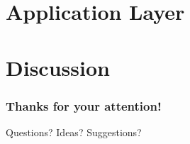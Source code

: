\documentclass{beamer}
\begin{document}


\section{Application Layer}


\section*{Discussion}
\begin{frame}
	\frametitle{Thanks for your attention!}
	\huge{Questions? Ideas? Suggestions?}
\end{frame}
\end{document}
